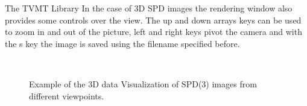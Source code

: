 \begin{chapter}{The TVMT Library}
In the case of 3D SPD images the rendering window also provides some controls over the view. The up and down arrays keys can be used to zoom in and out of the picture, left and right keys
pivot the camera and with the s key the image is saved using the filename specified before.
\begin{figure}[h!]
    \centering
    \\
    \caption[3D SPD(3) Volume Visualization of a helix]{Example of the 3D data Visualization of SPD(3) images from different viewpoints.
	\label{fig:helix}
    }
\end{figure}

\FloatBarrier

\end{chapter}
